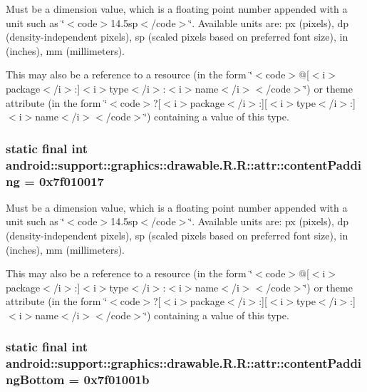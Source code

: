 Must be a dimension value, which is a floating point number appended with a unit such as \char`\"{}$<$code$>$14.5sp$<$/code$>$\char`\"{}. Available units are: px (pixels), dp (density-independent pixels), sp (scaled pixels based on preferred font size), in (inches), mm (millimeters). 

This may also be a reference to a resource (in the form \char`\"{}$<$code$>$@\mbox{[}$<$i$>$package$<$/i$>$:\mbox{]}$<$i$>$type$<$/i$>$:$<$i$>$name$<$/i$>$$<$/code$>$\char`\"{}) or theme attribute (in the form \char`\"{}$<$code$>$?\mbox{[}$<$i$>$package$<$/i$>$:\mbox{]}\mbox{[}$<$i$>$type$<$/i$>$:\mbox{]}$<$i$>$name$<$/i$>$$<$/code$>$\char`\"{}) containing a value of this type. \hypertarget{classandroid_1_1support_1_1graphics_1_1drawable_1_1_r_1_1attr_02dd97a3605697be42776c213a29b21c}{
\subsubsection[{contentPadding}]{\setlength{\rightskip}{0pt plus 5cm}static final int android::support::graphics::drawable.R.R::attr::contentPadding = 0x7f010017}}
\label{classandroid_1_1support_1_1graphics_1_1drawable_1_1_r_1_1attr_02dd97a3605697be42776c213a29b21c}


Must be a dimension value, which is a floating point number appended with a unit such as \char`\"{}$<$code$>$14.5sp$<$/code$>$\char`\"{}. Available units are: px (pixels), dp (density-independent pixels), sp (scaled pixels based on preferred font size), in (inches), mm (millimeters). 

This may also be a reference to a resource (in the form \char`\"{}$<$code$>$@\mbox{[}$<$i$>$package$<$/i$>$:\mbox{]}$<$i$>$type$<$/i$>$:$<$i$>$name$<$/i$>$$<$/code$>$\char`\"{}) or theme attribute (in the form \char`\"{}$<$code$>$?\mbox{[}$<$i$>$package$<$/i$>$:\mbox{]}\mbox{[}$<$i$>$type$<$/i$>$:\mbox{]}$<$i$>$name$<$/i$>$$<$/code$>$\char`\"{}) containing a value of this type. \hypertarget{classandroid_1_1support_1_1graphics_1_1drawable_1_1_r_1_1attr_9aa5cf1f49b3c01b6a8aed1a92b4e771}{
\subsubsection[{contentPaddingBottom}]{\setlength{\rightskip}{0pt plus 5cm}static final int android::support::graphics::drawable.R.R::attr::contentPaddingBottom = 0x7f01001b}}
\label{classandroid_1_1support_1_1graphics_1_1drawable_1_1_r_1_1attr_9aa5cf1f49b3c01b6a8aed1a92b4e771}


